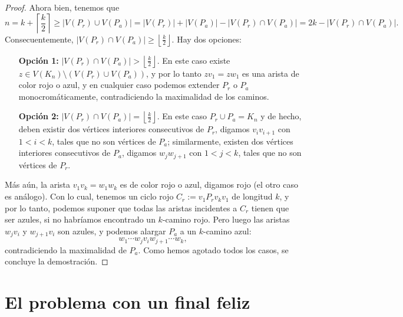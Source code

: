 \documentclass[12pt]{report}
\theoremstyle{plain}
\theoremstyle{definition}
\newcommand{\abs}[1]{\left \vert #1 \right \vert}
\newcommand{\ceil}[1]{\left\lceil #1  \right\rceil}
\newcommand{\floor}[1]{\left\lfloor #1  \right\rfloor}
\begin{document}
\begin{proof}
Ahora bien, tenemos que
\[
    n  = k + \ceil{\frac k 2} \geq \abs{V(P_r) \cup V(P_a)} = \abs{V(P_r)} + \abs{V (P_a)} - \abs{V(P_r) \cap V(P_a)} = 2k - \abs{V(P_r) \cap V(P_a)}.
\]
Consecuentemente, $\abs{V(P_r) \cap V(P_a)} \geq \floor{\frac{k}{2}}$. Hay dos opciones:
\begin{enumerate}
\item[\textbf{Opción 1:}] $\abs{V(P_r) \cap V(P_a)} > \floor{\frac{k}{2}}$. En este caso existe $z \in V(K_n) \setminus (V(P_r) \cup V(P_a))$, y por lo tanto $z v_1 = z w_1$ es una arista de color rojo o azul, y en cualquier caso podemos extender $P_r$ o $P_a$ monocromáticamente, contradiciendo la maximalidad de los caminos.
\item[\textbf{Opción 2:}] $\abs{V(P_r) \cap V(P_a)} = \floor{\frac{k}{2}}$. En este caso $P_r \cup P_a = K_n$ y de hecho, deben existir dos vértices interiores consecutivos de $P_r$, digamos $v_i v_{i+1}$ con $1 < i < k$, tales que no son vértices de $P_a$; similarmente, existen dos vértices interiores consecutivos de $P_a$, digamos $w_j w_{j+1}$ con $1 < j < k$, tales que no son vértices de $P_r$.
\end{enumerate}

Más aún, la arista $v_1 v_k = w_1 w_k$ es de color rojo o azul, digamos rojo (el otro caso es análogo). Con lo cual, tenemos un ciclo rojo $C_r := v_1 P_r v_{k} v_1$ de longitud $k$, y por lo tanto, podemos suponer que todas las aristas incidentes a $C_r$ tienen que ser azules, si no habríamos encontrado un $k$-camino rojo. Pero luego las aristas $w_j v_i$ y $w_{j+1} v_i$ son azules, y podemos alargar $P_a$ a un $k$-camino azul:
\[
    w_1 \cdots w_j v_i w_{j+1} \cdots w_k,
\]
contradiciendo la maximalidad de $P_a$. Como hemos agotado todos los casos, se concluye la demostración.
\end{proof}

\section{El problema con un final feliz}
\end{document}
